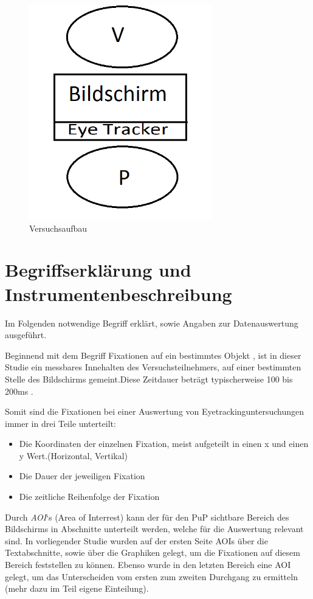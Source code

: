 \begin{figure}[H]
\noindent\hspace{0.5mm}\includegraphics[width=8cm]{./Ressourcen/Versuchsaufbau.png}
\caption{Versuchsaufbau}
\end{figure}

\section{Begriffserklärung und Instrumentenbeschreibung}
Im Folgenden notwendige Begriff erklärt, sowie Angaben zur Datenauswertung ausgeführt.


Beginnend mit dem Begriff \grqq Fixationen auf ein bestimmtes Objekt \grqq, ist in dieser Studie ein messbares Innehalten des Versuchsteilnehmers, auf einer bestimmten Stelle des Bildschirms gemeint.\grqq Diese Zeitdauer beträgt typischerweise 100 bis 200ms\cite{EyetrackingFixation} .\grqq

Somit sind die Fixationen bei einer Auswertung von Eyetrackinguntersuchungen immer in drei Teile unterteilt:
    \begin{itemize}
        \item Die Koordinaten der einzelnen Fixation, meist aufgeteilt in einen x und einen y Wert.(Horizontal, Vertikal)
        \item Die Dauer der jeweiligen Fixation
        \item Die zeitliche Reihenfolge der Fixation
    \end{itemize}


Durch \textit{AOI}`s (\grqq Area of Interrest\grqq) kann der für den \gls{PuP} sichtbare Bereich des Bildschirms in Abschnitte unterteilt werden, welche für die Auswertung relevant sind. In vorliegender Studie wurden auf der ersten Seite AOIs über die Textabschnitte, sowie über die Graphiken gelegt, um die Fixationen auf diesem Bereich feststellen zu können. Ebenso wurde in den letzten Bereich eine AOI gelegt, um das Unterscheiden vom ersten zum zweiten Durchgang zu ermitteln (mehr dazu im Teil eigene Einteilung).

